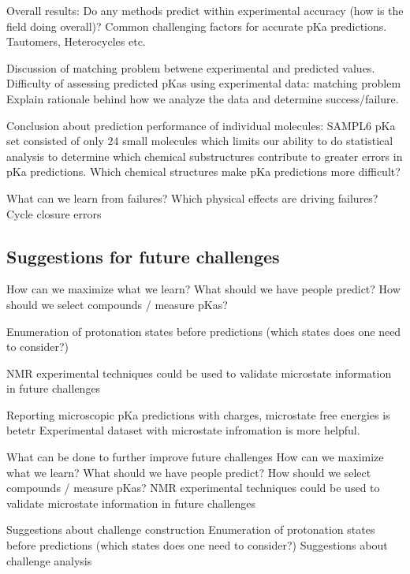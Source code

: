 \documentclass[9pt,lineno,final]{elife}
\begin{document}
Overall results:  
Do any methods predict within experimental accuracy (how is the field doing overall)?
Common challenging factors for accurate pKa predictions. Tautomers, Heterocycles etc.

Discussion of matching problem betwene experimental and predicted values.  
Difficulty of assessing predicted pKas using experimental data: matching problem
Explain rationale behind how we analyze the data and determine success/failure.

Conclusion about prediction performance of individual molecules:
SAMPL6 pKa set consisted of only 24 small molecules which limits our ability to do statistical analysis to determine which chemical substructures contribute to greater errors in pKa predictions.  
Which chemical structures make pKa predictions more difficult?  

What can we learn from failures? Which physical effects are driving failures?
Cycle closure errors


\subsection{Suggestions for future challenges}

How can we maximize what we learn?
What should we have people predict?
How should we select compounds / measure pKas?


Enumeration of protonation states before predictions (which states does one need to consider?)


NMR experimental techniques could be used to validate microstate information in future challenges

Reporting microscopic pKa predictions with charges, microstate free energies is betetr
Experimental dataset with microstate infromation is more helpful.

What can be done to further improve future challenges
How can we maximize what we learn?
What should we have people predict?
How should we select compounds / measure pKas? NMR experimental techniques could be used to validate microstate information in future challenges

Suggestions about challenge construction
Enumeration of protonation states before predictions (which states does one need to consider?)
Suggestions about challenge analysis
\end{document}
